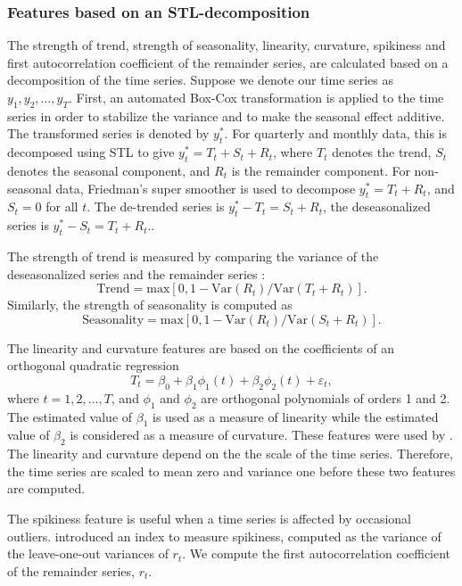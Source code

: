 \documentclass[11pt,a4paper,]{article}
\def\var{\text{Var}}
\begin{document}
\hypertarget{features-based-on-an-stl-decomposition}{%
\subsubsection*{Features based on an STL-decomposition}\label{features-based-on-an-stl-decomposition}}

The strength of trend, strength of seasonality, linearity, curvature, spikiness and first autocorrelation coefficient of the remainder series, are calculated based on a decomposition of the time series. Suppose we denote our time series as \(y_1, y_2, \dots,y_T\). First, an automated Box-Cox transformation \autocite{Guerrero1993} is applied to the time series in order to stabilize the variance and to make the seasonal effect additive. The transformed series is denoted by \(y_{t}^*\). For quarterly and monthly data, this is decomposed using STL \autocite{cleveland1990stl} to give \(y_t^*=T_t+S_t+R_t\), where \(T_t\) denotes the trend, \(S_t\) denotes the seasonal component, and \(R_t\) is the remainder component. For non-seasonal data, Friedman's super smoother \autocite{supsmu} is used to decompose \(y_t^*=T_t+R_t\), and \(S_t=0\) for all \(t\). The de-trended series is \(y_t^*-T_t=S_t+R_t\), the deseasonalized series is \(y_t^*-S_t = T_t+R_t\)..

The strength of trend is measured by comparing the variance of the deseasonalized series and the remainder series \autocite{wang2009rule}:
\[
    \text{Trend} = \text{max}\left[0, 1 - \var(R_{t})/\var(T_t+R_t)\right].
\]
Similarly, the strength of seasonality is computed as
\[
    \text{Seasonality} = \text{max}\left[0, 1- \var(R_{t})/ \var(S_t+R_t)\right].
\]

The linearity and curvature features are based on the coefficients of an orthogonal quadratic regression
\[
  T_t=\beta_0+\beta_1 \phi_1(t) + \beta_2\phi_2(t) + \varepsilon_t,
\]
where \(t=1, 2, \dots,T\), and \(\phi_1\) and \(\phi_2\) are orthogonal polynomials of orders 1 and 2. The estimated value of \(\beta_1\) is used as a measure of linearity while the estimated value of \(\beta_2\) is considered as a measure of curvature. These features were used by \textcite{hyndman2015large}. The linearity and curvature depend on the the scale of the time series. Therefore, the time series are scaled to mean zero and variance one before these two features are computed.

The spikiness feature is useful when a time series is affected by occasional outliers. \textcite{hyndman2015large} introduced an index to measure spikiness, computed as the variance of the leave-one-out variances of \(r_t\). We compute the first autocorrelation coefficient of the remainder series, \(r_t\).
\end{document}
